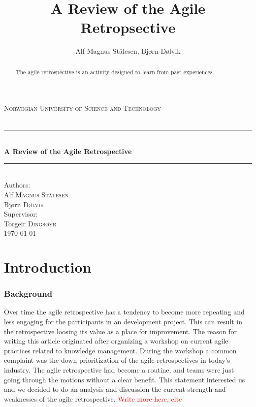 \documentclass[12pt]{article}
\newcommand\todo[1]{\textcolor{red}{#1}}
\newcommand{\HRule}{\rule{\linewidth}{0.5mm}}
\begin{document}
\title{A Review of the Agile Retropsective}

\author{Alf Magnus Stålesen, Bjørn Dølvik}
\begin{titlepage}
\begin{center}

\textsc{\LARGE Norwegian University of Science and Technology}\\[1.5cm]

\textsc{\Large }\\[0.5cm]

\HRule \\[0.4cm]
{ \huge \bfseries A Review of the Agile Retrospective\\[0.4cm] }

\HRule \\[1.5cm]

{\large Authors:}\\

Alf \textsc{Magnus Stålesen}\\
Bjørn \textsc{Dølvik}\\[1.0cm]

{\large Supervisor:}\\

Torgeir \textsc{Dingsøyr}\\[1.0cm]

{\large \today}

\end{center}
\end{titlepage}

\begin{abstract}

The agile retrospective is an activity designed to learn from past experiences. 

\end{abstract}
\clearpage

\tableofcontents
\clearpage

\part{Introduction}
\section{Background}
Over time the agile retrospective has a tendency to become more repeating and less engaging for the participants in an development project. This can result in the retrospective loosing its value as a place for improvement. The reason for writing this article originated after organizing a workshop on current agile practices related to knowledge management. During the workshop a common complaint was the down-prioritization of the agile retrospectives in today's industry. The agile retrospective had become a routine, and teams were just going through the motions without a clear benefit. This statement interested us and we decided to do an analysis and discussion the current strength and weaknesses of the agile retrospective.
\todo{Write more here, cite}
\end{document}
